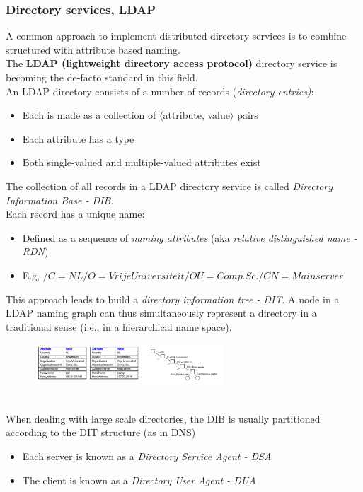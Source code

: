 \documentclass[10pt,a4paper]{article}
\begin{document}
\subsubsection{Directory services, LDAP}
A common approach to implement distributed directory services is to combine structured with attribute based naming. \\
The \textbf{LDAP (lightweight directory access protocol)} directory service is becoming the de-facto standard in this field. \\ An LDAP directory consists of a number of records (\textit{directory entries)}:
\begin{itemize}
	\item Each is made as a collection of $\langle$attribute, value$\rangle$ pairs
	\item Each attribute has a type
	\item Both single-valued and multiple-valued attributes exist
\end{itemize}
The collection of all records in a LDAP directory service is called \textit{Directory Information Base - DIB}.\\ Each record has a unique name:
\begin{itemize}
	\item Defined as a sequence of \textit{naming attributes} (aka \textit{relative distinguished name - RDN})
	\item E.g, $/C=NL/ O=Vrije Universiteit/ OU=Comp. Sc./CN=Main server$
\end{itemize}
This approach leads to build a \textit{directory information tree - DIT}. A node in a LDAP naming graph can thus simultaneously represent a directory in a traditional sense (i.e., in a hierarchical name space).
\begin{figure}[h!]
 \hfill \includegraphics[width=200pt]{images/ldap.png}\hspace*{\fill}
  \label{fig:ldap}
\end{figure} \\
When dealing with large scale directories, the DIB is usually partitioned according to the DIT structure (as in DNS)
\begin{itemize}
	\item Each server is known as a \textit{Directory Service Agent - DSA}
	\item The client is known as a \textit{Directory User Agent - DUA}
\end{itemize}
\end{document}
